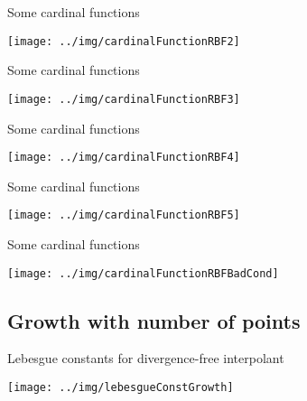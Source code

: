 \documentclass{beamer}
\begin{document}
\begin{frame}{Some cardinal functions}
  \begin{center}
    \texttt{[image: ../img/cardinalFunctionRBF2]}
  \end{center}
\end{frame}

\begin{frame}{Some cardinal functions}
  \begin{center}
    \texttt{[image: ../img/cardinalFunctionRBF3]}
  \end{center}
\end{frame}

\begin{frame}{Some cardinal functions}
  \begin{center}
    \texttt{[image: ../img/cardinalFunctionRBF4]}
  \end{center}
\end{frame}

\begin{frame}{Some cardinal functions}
  \begin{center}
    \texttt{[image: ../img/cardinalFunctionRBF5]}
  \end{center}
\end{frame}

\begin{frame}{Some cardinal functions}
  \begin{center}
    \texttt{[image: ../img/cardinalFunctionRBFBadCond]}
  \end{center}
\end{frame}

\subsection{Growth with number of points}
\begin{frame}{Lebesgue constants for divergence-free interpolant}
  \begin{center}
    \texttt{[image: ../img/lebesgueConstGrowth]}
  \end{center}
\end{frame}
\end{document}
